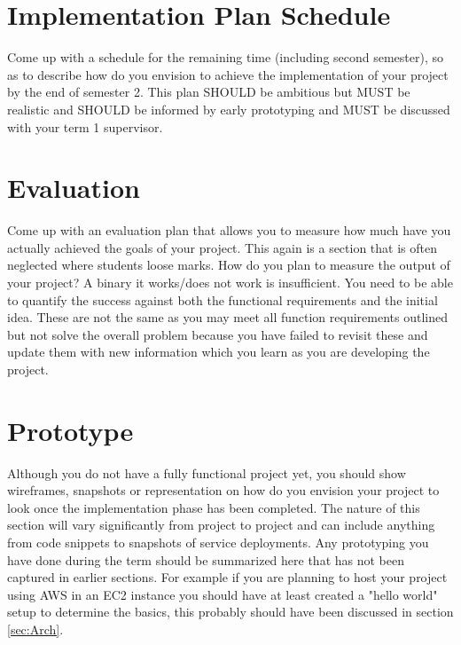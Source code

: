 \section{Implementation Plan Schedule}
Come up with a schedule for the remaining time (including second semester), so as to describe how do you envision to achieve the implementation of your project by the end of semester 2. This plan SHOULD be ambitious but MUST be realistic and SHOULD be informed by early prototyping and MUST be discussed with your term 1 supervisor.

\section{Evaluation}
Come up with an evaluation plan that allows you to measure how much have you actually achieved the goals of your project. This again is a section that is often neglected where students loose marks. How do you plan to measure the output of your project? A binary it works/does not work is insufficient. You need to be able to quantify the success against both the functional requirements and the initial idea. These are not the same as you may meet all function requirements outlined but not solve the overall problem because you have failed to revisit these and update them with new information which you learn as you are developing the project.

\section{Prototype}
Although you do not have a fully functional project yet, you should show wireframes, snapshots or representation on how do you envision your project to look once the implementation phase has been completed. The nature of this section will vary significantly from project to project and can include anything from code snippets to snapshots of service deployments. Any prototyping you have done during the term should be summarized here that has not been captured in earlier sections. For example if you are planning to host your project using AWS in an EC2 instance you should have at least created a "hello world" setup to determine the basics, this probably should have been discussed in section \ref{sec:Arch}.